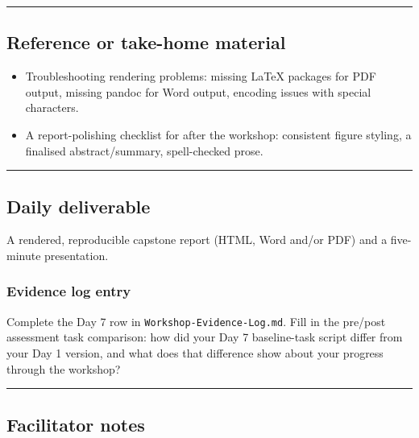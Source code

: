 \documentclass[11pt]{article}
\providecommand{\tightlist}{%
  \setlength{\itemsep}{0pt}\setlength{\parskip}{0pt}}
\begin{document}
\begin{center}\rule{0.5\linewidth}{0.5pt}\end{center}

\hypertarget{reference-or-take-home-material}{%
\subsection{Reference or take-home
material}\label{reference-or-take-home-material}}

\begin{itemize}
\tightlist
\item
  Troubleshooting rendering problems: missing LaTeX packages for PDF
  output, missing pandoc for Word output, encoding issues with special
  characters.
\item
  A report-polishing checklist for after the workshop: consistent figure
  styling, a finalised abstract/summary, spell-checked prose.
\end{itemize}

\begin{center}\rule{0.5\linewidth}{0.5pt}\end{center}

\hypertarget{daily-deliverable}{%
\subsection{Daily deliverable}\label{daily-deliverable}}

A rendered, reproducible capstone report (HTML, Word and/or PDF) and a
five-minute presentation.

\hypertarget{evidence-log-entry}{%
\subsubsection{Evidence log entry}\label{evidence-log-entry}}

Complete the Day 7 row in \texttt{Workshop-Evidence-Log.md}. Fill in the
pre/post assessment task comparison: how did your Day 7 baseline-task
script differ from your Day 1 version, and what does that difference
show about your progress through the workshop?

\begin{center}\rule{0.5\linewidth}{0.5pt}\end{center}

\hypertarget{facilitator-notes}{%
\subsection{Facilitator notes}\label{facilitator-notes}}
\end{document}
